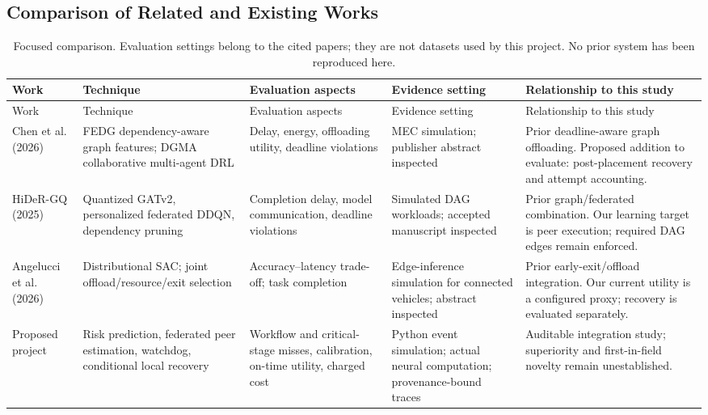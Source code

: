 \documentclass[11pt,a4paper]{article}
\begin{document}
\begin{landscape}
\section{Comparison of Related and Existing Works}
\small
\begin{longtable}{L{2.6cm}L{4.0cm}L{4.2cm}L{4.0cm}L{6.0cm}}
\caption{Focused comparison. Evaluation settings belong to the cited papers;
they are not datasets used by this project. No prior system has been reproduced
here.}\label{tab:literature}\\
\toprule
Work & Technique & Evaluation aspects & Evidence setting & Relationship to this study\\
\midrule\endfirsthead
\toprule Work & Technique & Evaluation aspects & Evidence setting & Relationship to this study\\
\midrule\endhead
\bottomrule\endfoot
Chen et al. (2026)\cite{chen2026} & FEDG dependency-aware graph features; DGMA collaborative multi-agent DRL & Delay, energy, offloading utility, deadline violations & MEC simulation; publisher abstract inspected & Prior deadline-aware graph offloading. Proposed addition to evaluate: post-placement recovery and attempt accounting.\\
HiDeR-GQ (2025)\cite{kaur2025} & Quantized GATv2, personalized federated DDQN, dependency pruning & Completion delay, model communication, deadline violations & Simulated DAG workloads; accepted manuscript inspected & Prior graph/federated combination. Our learning target is peer execution; required DAG edges remain enforced.\\
Angelucci et al. (2026)\cite{angelucci2026} & Distributional SAC; joint offload/resource/exit selection & Accuracy--latency trade-off; task completion & Edge-inference simulation for connected vehicles; abstract inspected & Prior early-exit/offload integration. Our current utility is a configured proxy; recovery is evaluated separately.\\
Proposed project & Risk prediction, federated peer estimation, watchdog, conditional local recovery & Workflow and critical-stage misses, calibration, on-time utility, charged cost & Python event simulation; actual neural computation; provenance-bound traces & Auditable integration study; superiority and first-in-field novelty remain unestablished.\\
\end{longtable}
\end{landscape}
\end{document}

